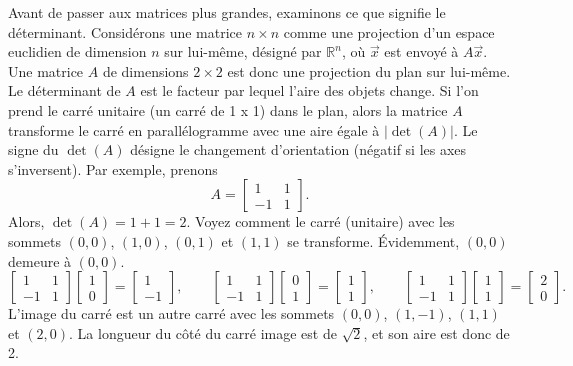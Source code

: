 Avant de passer aux matrices plus grandes, examinons ce que signifie le déterminant. Considérons une matrice $n \times n$
comme une projection d'un espace euclidien de dimension $n$ sur lui-même, désigné par ${\mathbb{R}}^n$, où $\vec{x}$ est envoyé à $A \vec{x}$.
Une matrice $A$ de dimensions $2 \times 2$ est donc une projection du plan sur lui-même. Le déterminant de 
$A$ est le facteur par lequel l'aire des objets change. Si l'on prend le carré unitaire (un carré de 1 x 1) dans le plan, alors la matrice
$A$ transforme le carré en parallélogramme avec une aire égale à $\lvert\det(A)\rvert$. Le signe
du $\det(A)$ désigne le changement d'orientation (négatif si les axes s'inversent). Par exemple, prenons
\begin{equation*}
A =
\begin{bmatrix}
1 & 1 \\
-1 & 1
\end{bmatrix} .
\end{equation*}
Alors, $\det(A) = 1+1 = 2$. Voyez comment le carré (unitaire) avec les sommets
$(0,0)$, $(1,0)$, $(0,1)$ et $(1,1)$ se transforme. Évidemment, $(0,0)$ demeure à $(0,0)$. 
\begin{equation*}
\begin{bmatrix}
1 & 1 \\
-1 & 1
\end{bmatrix}
\begin{bmatrix}
1 \\ 0
\end{bmatrix} =
\begin{bmatrix}
1 \\
-1 
\end{bmatrix}
,
\qquad
\begin{bmatrix}
1 & 1 \\
-1 & 1
\end{bmatrix}
\begin{bmatrix}
0 \\ 1
\end{bmatrix} =
\begin{bmatrix}
1 \\
1 
\end{bmatrix}
,
\qquad
\begin{bmatrix}
1 & 1 \\
-1 & 1
\end{bmatrix}
\begin{bmatrix}
1 \\ 1
\end{bmatrix} =
\begin{bmatrix}
2 \\
0 
\end{bmatrix}
.
\end{equation*}
L'image du carré est un autre carré avec les sommets $(0,0)$, $(1,-1)$,
$(1,1)$ et $(2,0)$. La longueur du côté du carré image est de $\sqrt{2}$, et son aire est donc de 2.

